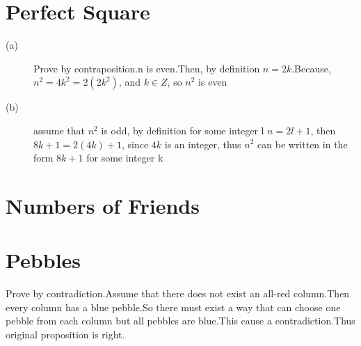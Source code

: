 \documentclass{article}
\begin{document}
	\section{Perfect Square}
	\begin{description}
		\item[(a)] 
		Prove by contraposition.n is even.Then, by definition $n=2k$.Because, $n^2=4k^2=2(2k^2)$, and $k \in Z$, so $n^2$ is even
		\item[(b)] assume that $n^2$ is odd, by definition for some integer l $n = 2l + 1$, then $8k + 1 = 2(4k) + 1$, since $4k$ is an integer, thus $n^2$ can be written in the form $8k + 1$ for some integer k
	\end{description}
	\section{Numbers of Friends}
	\section{Pebbles}
		Prove by contradiction.Assume that there does not exist an all-red column.Then every column has a blue pebble.So there must exist a way that can choose one pebble from each column but all pebbles are blue.This cause a contradiction.Thus original proposition is right.
\end{document}

